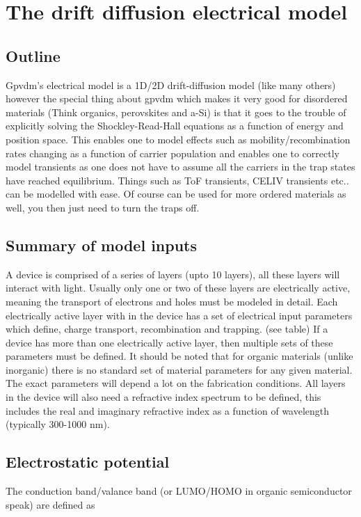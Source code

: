 \newpage
\section{The drift diffusion electrical model}

\subsection{Outline}
Gpvdm's electrical model is a 1D/2D drift-diffusion model (like many others) however the special thing about gpvdm which makes it very good for disordered materials (Think organics, perovskites and a-Si) is that it goes to the trouble of explicitly solving the Shockley-Read-Hall equations as a function of energy and position space.  This enables one to model effects such as mobility/recombination rates changing as a function of carrier population and enables one to correctly model transients as one does not have to assume all the carriers in the trap states have reached equilibrium.  Things such as ToF transients, CELIV transients etc.. can be modelled with ease. Of course can be used for more ordered materials as well, you then just need to turn the traps off.

\subsection{Summary of model inputs}
A device is comprised of a series of layers (upto 10 layers), all these layers will interact with light.  Usually only one or two of these layers are electrically active, meaning the transport of electrons and holes must be modeled in detail.  Each electrically active layer with in the device has a set of electrical input parameters which define, charge transport, recombination and trapping. (see table)  If a device has more than one electrically active layer, then multiple sets of these parameters must be defined.  It should be noted that for organic materials (unlike inorganic) there is no standard set of material parameters for any given material.  The exact parameters will depend a lot on the fabrication conditions.  All layers in the device will also need a refractive index spectrum to be defined, this includes the real and imaginary refractive index as a function of wavelength (typically 300-1000 nm).
 

\subsection{Electrostatic potential}
The conduction band/valance band (or LUMO/HOMO in organic semiconductor speak) are defined as

